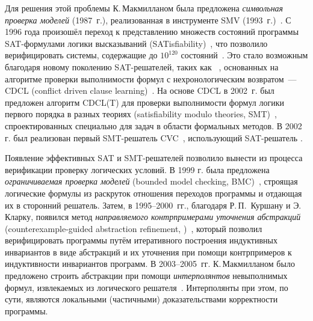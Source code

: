 Для решения  этой проблемы К.\,Макмилланом была предложена \emph{символьная проверка моделей} (1987~г.), реализованная в инструменте SMV (1993~г.)~\cite{10.1007/3-540-61474-5_93}.
С 1996 года произошёл переход к представлению множеств состояний программы SAT-формулами логики высказываний (SATisfiability)~\cite{10.5555/1864519.1864564}, что позволило верифицировать системы, содержащие до  $10^{120}$ состояний~\cite{10.1007/3-540-61474-5_93}.
Это стало возможным благодаря новому поколению SAT-решателей, таких как \chaff{}~\cite{10.1145/378239.379017}, основанных на алгоритме проверки выполнимости формул с нехронологическим возвратом~--- CDCL (conflict driven clause learning)~\cite{silva1996grasp}.
На основе CDCL в 2002~г. был предложен алгоритм CDCL(T) для проверки выполнимости формул логики первого порядка в разных теориях (satisfiability modulo theories, SMT)~\cite{10.1007/3-540-45757-7_26}, спроектированных специально для задач в области формальных методов.
В 2002 г. был реализован первый SMT-решатель \textsc{CVC}~\cite{10.1007/3-540-45657-0_40}, использующий SAT-решатель \chaff{}.

Появление эффективных SAT и SMT-решателей позволило вынести из процесса верификации проверку логических условий.
В 1999 г. была предложена \emph{ограничиваемая проверка моделей} (bounded model checking, BMC)~\cite{10.1007/3-540-49059-0_14}, строящая логические формулы из раскруток отношения переходов программы и отдающая их в сторонний решатель.
Затем, в \numrange{1995}{2000}~гг., благодаря Р.\,П.~Куршану и Э.\,Кларку, появился метод \emph{направляемого контрпримерами уточнения абстракций} (counterexample-guided abstraction refinement, \cegar{})~\cite{Kurshan1995,cegar}, который позволил  верифицировать программы путём итеративного построения индуктивных инвариантов в виде абстракций и их уточнения при помощи контрпримеров к индуктивности инвариантов программ.
В \numrange{2003}{2005}~гг. К.\,Макмилланом было предложено строить абстракции при помощи \emph{интерполянтов} невыполнимых формул, извлекаемых из логического решателя~\cite{10.1007/978-3-540-45069-6_1,10.1007/978-3-540-31980-1_1}.
Интерполянты при этом, по сути, являются локальными (частичными) доказательствами корректности программы.

